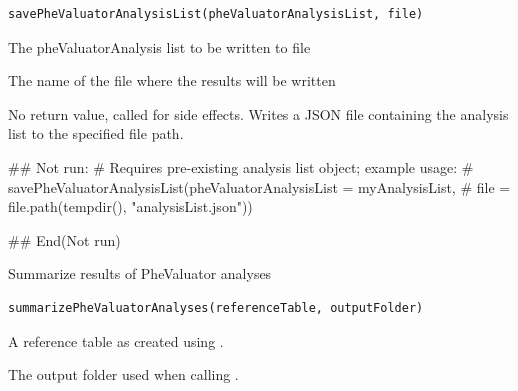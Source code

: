 \documentclass[a4paper]{book}
\begin{document}
%
\begin{Usage}
\begin{verbatim}
savePheValuatorAnalysisList(pheValuatorAnalysisList, file)
\end{verbatim}
\end{Usage}
%
\begin{Arguments}
\begin{ldescription}
\item[\code{pheValuatorAnalysisList}] The pheValuatorAnalysis list to be written to file

\item[\code{file}] The name of the file where the results will be written
\end{ldescription}
\end{Arguments}
%
\begin{Value}
No return value, called for side effects. Writes a JSON file containing the analysis list
to the specified file path.
\end{Value}
%
\begin{Examples}
\begin{ExampleCode}
## Not run: 
# Requires pre-existing analysis list object; example usage:
# savePheValuatorAnalysisList(pheValuatorAnalysisList = myAnalysisList,
#                             file = file.path(tempdir(), "analysisList.json"))

## End(Not run)

\end{ExampleCode}
\end{Examples}
%
\begin{Description}
Summarize results of PheValuator analyses
\end{Description}
%
\begin{Usage}
\begin{verbatim}
summarizePheValuatorAnalyses(referenceTable, outputFolder)
\end{verbatim}
\end{Usage}
%
\begin{Arguments}
\begin{ldescription}
\item[\code{referenceTable}] A reference table as created using .

\item[\code{outputFolder}] The output folder used when calling .
\end{ldescription}
\end{Arguments}
\end{document}
